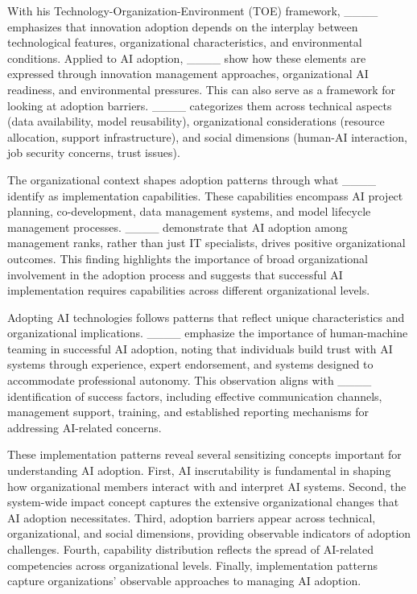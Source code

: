 With his Technology-Organization-Environment (TOE) framework, ____ emphasizes that innovation adoption depends on the interplay between technological features, organizational characteristics, and environmental conditions. Applied to AI adoption, ____ show how these elements are expressed through innovation management approaches, organizational AI readiness, and environmental pressures. This can also serve as a framework for looking at adoption barriers. ____ categorizes them across technical aspects (data availability, model reusability), organizational considerations (resource allocation, support infrastructure), and social dimensions (human-AI interaction, job security concerns, trust issues).

The organizational context shapes adoption patterns through what ____ identify as implementation capabilities. These capabilities encompass AI project planning, co-development, data management systems, and model lifecycle management processes. ____ demonstrate that AI adoption among management ranks, rather than just IT specialists, drives positive organizational outcomes. This finding highlights the importance of broad organizational involvement in the adoption process and suggests that successful AI implementation requires capabilities across different organizational levels.

Adopting AI technologies follows patterns that reflect unique characteristics and organizational implications. ____ emphasize the importance of human-machine teaming in successful AI adoption, noting that individuals build trust with AI systems through experience, expert endorsement, and systems designed to accommodate professional autonomy. This observation aligns with ____ identification of success factors, including effective communication channels, management support, training, and established reporting mechanisms for addressing AI-related concerns.

These implementation patterns reveal several sensitizing concepts important for understanding AI adoption. First, AI inscrutability is fundamental in shaping how organizational members interact with and interpret AI systems. Second, the system-wide impact concept captures the extensive organizational changes that AI adoption necessitates. Third, adoption barriers appear across technical, organizational, and social dimensions, providing observable indicators of adoption challenges. Fourth, capability distribution reflects the spread of AI-related competencies across organizational levels. Finally, implementation patterns capture organizations' observable approaches to managing AI adoption.

